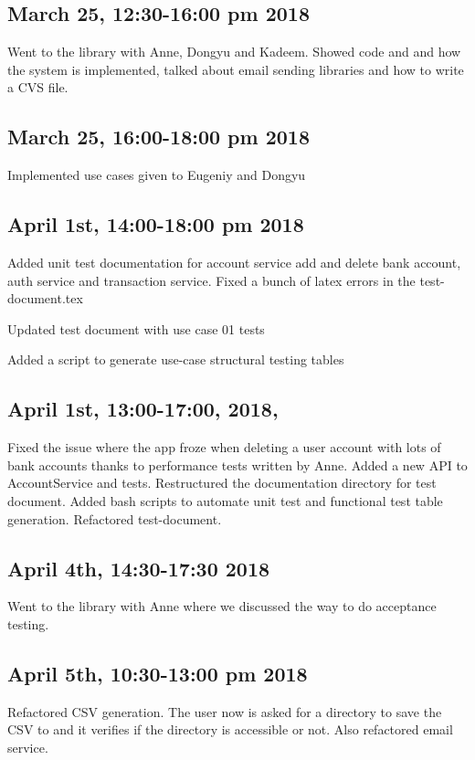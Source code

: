 \documentclass[12pt]{article}
\begin{document}
\maketitle

\subsection*{March 25, 12:30-16:00 pm 2018}
Went to the library with Anne, Dongyu and Kadeem. Showed code and and how the system is implemented, talked about email sending libraries and how to write a CVS file. 

\subsection*{March 25, 16:00-18:00 pm 2018}
Implemented use cases given to Eugeniy and Dongyu

\subsection*{April 1st, 14:00-18:00 pm 2018}

 Added unit test documentation for account service add and delete bank account, auth service and transaction service. Fixed a bunch of latex errors in the test-document.tex
 
Updated test document with use case 01 tests

Added a script to generate use-case structural testing tables

\subsection*{April 1st, 13:00-17:00, 2018, }
 Fixed the issue where the app froze when deleting a user account with lots of bank accounts thanks to performance tests written by Anne. Added a new API to AccountService and tests. Restructured the documentation directory for test document. Added bash scripts to automate unit test and functional test table generation. Refactored test-document.

\subsection*{April 4th, 14:30-17:30 2018}
 Went to the library with Anne where we discussed the way to do acceptance testing.
 
\subsection*{April 5th, 10:30-13:00 pm 2018}
 Refactored CSV generation. The user now is asked for a directory to save the CSV to and it verifies if the directory is accessible or not.
 Also refactored email service.
 
\end{document}
